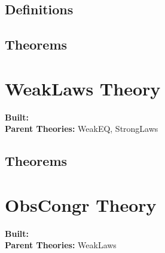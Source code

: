 \documentclass[11pt, twoside]{article}
\begin{document}

\subsection{Definitions}

\HOLWeakEQDefinitions

\subsection{Theorems}

\HOLWeakEQTheorems

\section{WeakLaws Theory}
\begin{flushleft}
\textbf{Built:} \HOLWeakLawsDate \\[2pt]
\textbf{Parent Theories:} WeakEQ, StrongLaws
\end{flushleft}



\subsection{Theorems}

\HOLWeakLawsTheorems

\section{ObsCongr Theory}
\begin{flushleft}
\textbf{Built:} \HOLObsCongrDate \\[2pt]
\textbf{Parent Theories:} WeakLaws
\end{flushleft}
\end{document}
